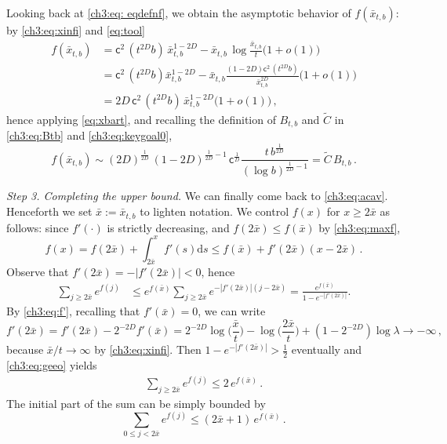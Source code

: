 \documentclass[a4paper,reqno,11pt]{amsart}
\numberwithin{equation}{section}
\renewcommand{\tilde}{\widetilde}          %
\newcommand{\dd}{\text{\rm d}}             %
\newcommand\sfc{\mathsf{c}}
\def\dd{\mathrm{d}}
\begin{document}
Looking back at \eqref{ch3:eq: eqdefnf}, we obtain
the asymptotic behavior of $f(\bar x_{t,b})$:
by \eqref{ch3:eq:xinfi} and \eqref{eq:tool}
\begin{equation} \label{eq:estmax}
\begin{split}
	f(\bar x_{t,b}) & = \sfc^2 \, (t^{2D} b) \, \bar x_{t,b}^{1-2D} -
	\bar x_{t,b} \, \log \frac{\bar x_{t,b}}{t} \big(1+o(1)\big)  \\
	& = \sfc^2 \, (t^{2D} b) \bar x_{t,b}^{1-2D} - 
	\bar x_{t,b} \frac{(1-2D) \sfc^2 \,(t^{2D} b)}{\bar x_{t,b}^{2D}} \big(1+o(1)\big) \\
	& = 2D \, \sfc^2 \, (t^{2D} b) \, \bar x_{t,b}^{1-2D}  \big(1+o(1)\big) \,,
\end{split}
\end{equation}
hence applying \eqref{eq:xbart},
and recalling the definition of $B_{t,b}$ and $\tilde C$ in \eqref{ch3:eq:Btb}
and \eqref{ch3:eq:keygoal0},
\begin{equation} \label{eq:estmax2}
	f(\bar x_{t,b}) \sim (2D)^{\frac{1}{2D}} \, (1-2D)^{\frac{1}{2D}-1} \, \sfc^{\frac{1}{D}}
	\frac{t \, b^{\frac{1}{2D}}}
	{(\log b)^{\frac{1}{2D}-1}}
	= \tilde C \, B_{t,b} \,.
\end{equation}

\medskip
\noindent
\emph{Step 3. Completing the upper bound.}
We can finally come back to \eqref{ch3:eq:acav}.
Henceforth we set $\bar x := \bar x_{t,b}$ to lighten notation.
We control $f(x)$ for $x \ge 2 \bar x$
as follows: since $f'(\cdot)$ is strictly
decreasing, and $f(2\bar x) \le f(\bar x)$ by \eqref{ch3:eq:maxf},
\[
 f(x)=f(2\bar x)+\int_{2\bar x}^x f'(s) \dd s 
 \leq f(\bar x)+f'(2\bar x)(x-2\bar x) \,.
\]
Observe that $f'(2\bar x) = -|f'(2\bar x)| <0$, hence
\begin{equation}\label{ch3:eq:geeo}
 \begin{split}
\sum_{j \geq 2\bar x}e^{f(j)} &\leq e^{f(\bar x)} 
 \sum_{j \geq 2\bar x}e^{-|f'(2\bar x)|(j-2\bar x)}
= \frac{e^{f(\bar x)}}{1-e^{-|f'(2\bar x)|}}. 
 \end{split}
\end{equation}
By \eqref{ch3:eq:f'}, recalling that $f'(\bar x) = 0$, we can write
\begin{equation*}
	f'(2\bar x) = f'(2\bar x) - 2^{-2D} f'(\bar x)
	= 2^{-2D} \log \bigg( \frac{\bar x}{t} \bigg)
	- \log \bigg( \frac{2\bar x}{t} \bigg)
	+ (1-2^{-2D})\log \lambda
	\to -\infty \,,
\end{equation*}
because $\bar x / t \to \infty$ by \eqref{ch3:eq:xinfi}.
Then $1-e^{-|f'(2\bar x)|}> \frac{1}{2}$ eventually and
\eqref{ch3:eq:geeo} yields
\begin{equation}\label{ch3:eq:boundtail}
\begin{split}
\sum_{j \ge 2\bar x}e^{f(j)} 
\leq 2 \, e^{f(\bar x)} \,.
\end{split}
\end{equation}
The initial part of the sum can be simply bounded by
\begin{equation}\label{ch3:eq:boundiniz}
\sum_{0 \le j < 2\bar x}
 e^{f(j)} \leq (2 \bar x+1) \, e^{f(\bar x)} \,.
\end{equation}
\end{document}
